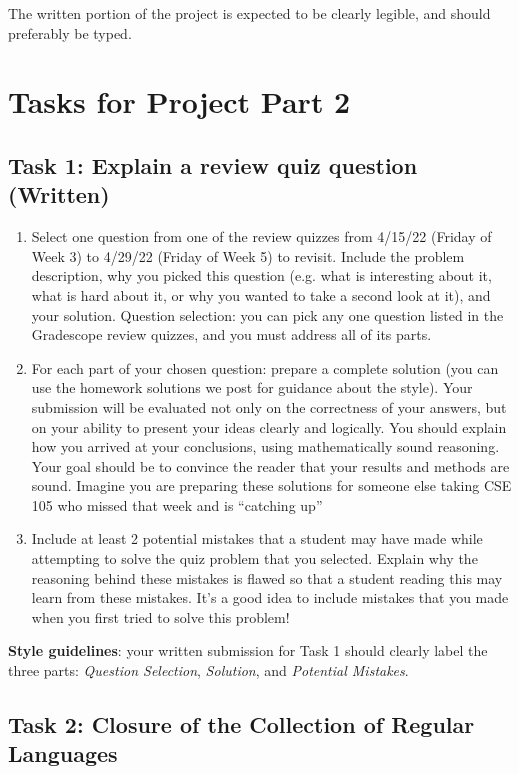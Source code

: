 The written portion of the project is expected to be clearly legible, and should preferably be typed.

 \newpage
 \section{Tasks for Project Part 2}


 \subsection{Task 1: Explain a review quiz question (Written)}
	
	\begin{enumerate}
		\item Select one question from one of the review quizzes from 4/15/22 (Friday of Week 3) to 4/29/22  (Friday of Week 5) to revisit. Include the problem description, why you picked this question (e.g. what is interesting about it, what is hard about it, or why you wanted to take a second look at it), and your solution. Question selection: you can pick any one question listed in the Gradescope review quizzes, and you must address  all  of its parts. 
 		\item For each part of your chosen question: prepare a complete solution (you can use the homework solutions we post for guidance about the style). Your submission will be evaluated not only on the correctness of your answers, but on your ability to present your ideas clearly and logically. You should explain how you arrived at your conclusions, using mathematically sound reasoning. Your goal should be to convince the reader that your results and methods are sound. Imagine you are preparing these solutions for someone else taking CSE 105 who missed that week and is “catching up”
 
 		\item Include at least 2 potential mistakes that a student may have made while attempting to solve the quiz problem that you selected. Explain why the reasoning behind these mistakes is flawed so that a student reading this may learn from these mistakes. It’s a good idea to include mistakes that you made when you first tried to solve this problem!	
	\end{enumerate}
	
	{\bf Style guidelines}: your written submission for Task 1 should clearly label the three parts:
	{\it Question Selection}, {\it Solution},  and {\it Potential Mistakes}.

\newpage
\subsection{Task 2: Closure of the Collection of Regular Languages}
	
